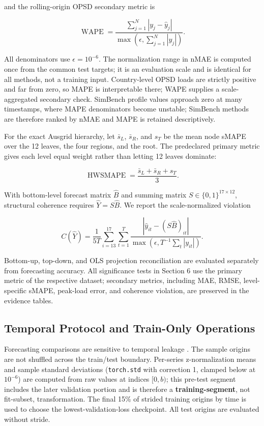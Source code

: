 \documentclass[electronics,article,submit,moreauthors]{Definitions/mdpi}
\begin{document}
and the rolling-origin OPSD secondary metric is

\[
\operatorname{WAPE}=\frac{\sum_{j=1}^{N}|y_j-\hat y_j|}{\max(\epsilon,\sum_{j=1}^{N}|y_j|)}.
\]

All denominators use \(\epsilon=10^{-6}\). The normalization range in nMAE is computed once from the common test targets; it is an evaluation scale and is identical for all methods, not a training input. Country-level OPSD loads are strictly positive and far from zero, so MAPE is interpretable there; WAPE supplies a scale-aggregated secondary check. SimBench profile values approach zero at many timestamps, where MAPE denominators become unstable; SimBench methods are therefore ranked by nMAE and MAPE is retained descriptively.

For the exact Ausgrid hierarchy, let \(\bar s_L\), \(\bar s_R\), and \(s_T\) be the mean node sMAPE over the 12 leaves, the four regions, and the root. The predeclared primary metric gives each level equal weight rather than letting 12 leaves dominate:

\[
\operatorname{HWSMAPE}=\frac{\bar s_L+\bar s_R+s_T}{3}.
\]

With bottom-level forecast matrix \(\hat{B}\) and summing matrix \(S\in\{0,1\}^{17\times12}\), structural coherence requires \(\hat{Y}=S\hat{B}\). We report the scale-normalized violation

\[
C(\hat Y)=\frac{1}{5T}\sum_{i=13}^{17}\sum_{t=1}^{T}
\frac{|\hat y_{it}-(S\hat B)_{it}|}{\max(\epsilon,T^{-1}\sum_t|y_{it}|)}.
\]

Bottom-up, top-down, and OLS projection reconciliation are evaluated separately from forecasting accuracy. All significance tests in Section 6 use the primary metric of the respective dataset; secondary metrics, including MAE, RMSE, level-specific sMAPE, peak-load error, and coherence violation, are preserved in the evidence tables.

\subsection{Temporal Protocol and Train-Only Operations}\label{temporal-protocol-and-train-only-operations}

Forecasting comparisons are sensitive to temporal leakage \cite{ref8,ref26}. The sample origins are not shuffled across the train/test boundary. Per-series z-normalization means and sample standard deviations (\texttt{torch.std} with correction 1, clamped below at \(10^{-6}\)) are computed from raw values at indices \([0,b)\); this pre-test segment includes the later validation portion and is therefore a \textbf{training-segment}, not fit-subset, transformation. The final 15\% of strided training origins by time is used to choose the lowest-validation-loss checkpoint. All test origins are evaluated without stride.
\end{document}
